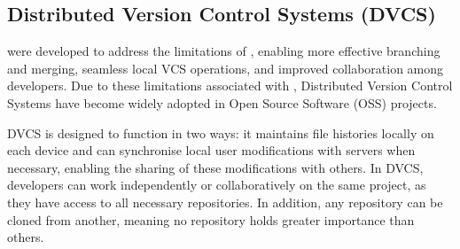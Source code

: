 \subsection{Distributed Version Control Systems (DVCS)}
\label{sec:dvcs}
 were developed to address the limitations of , enabling more effective branching and merging, seamless local VCS operations, and improved collaboration among developers. Due to these limitations associated with , Distributed Version Control Systems have become widely adopted in Open Source Software (OSS) projects.
\smallskip

DVCS is designed to function in two ways: it maintains file histories locally on each device and can synchronise local user modifications with servers when necessary, enabling the sharing of these modifications with others. In DVCS, developers can work independently or collaboratively on the same project, as they have access to all necessary repositories. In addition, any repository can be cloned from another, meaning no repository holds greater importance than others.





